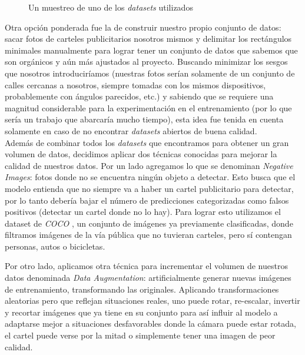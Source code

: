 \documentclass[a4paper]{article}
\begin{document}
\begin{figure}[H]
\caption{Un muestreo de uno de los \textit{datasets} utilizados}
\end{figure}

Otra opción ponderada fue la de construir nuestro propio conjunto de datos: sacar fotos de carteles publicitarios nosotros mismos y delimitar los rectángulos minimales manualmente para lograr tener un conjunto de datos que sabemos que son orgánicos y aún más ajustados al proyecto. Buscando minimizar los sesgos que nosotros introduciríamos (nuestras fotos serían solamente de un conjunto de calles cercanas a nosotros, siempre tomadas con los mismos dispositivos, probablemente con ángulos parecidos, etc.) y sabiendo que se requiere una magnitud considerable para la experimentación en el entrenamiento (por lo que sería un trabajo que abarcaría mucho tiempo), esta idea fue tenida en cuenta solamente en caso de no encontrar \textit{datasets} abiertos de buena calidad. \\

Además de combinar todos los \textit{datasets} que encontramos para obtener un gran volumen de datos, decidimos aplicar dos técnicas conocidas para mejorar la calidad de nuestros datos. Por un lado agregamos lo que se denominan \textit{Negative Images}: fotos donde no se encuentra ningún objeto a detectar. Esto busca que el modelo entienda que no siempre va a haber un cartel publicitario para detectar, por lo tanto debería bajar el número de predicciones categorizadas como falsos positivos (detectar un cartel donde no lo hay). Para lograr esto utilizamos el dataset de \textit{COCO} \cite{coco}, un conjunto de imágenes ya previamente clasificadas, donde filtramos imágenes de la vía pública que no tuvieran carteles, pero sí contengan personas, autos o bicicletas.

Por otro lado, aplicamos otra técnica para incrementar el volumen de nuestros datos denominada \textit{Data Augmentation}: artificialmente generar nuevas imágenes de entrenamiento, transformando las originales. Aplicando transformaciones aleatorias pero que reflejan situaciones reales, uno puede rotar, re-escalar, invertir y recortar imágenes que ya tiene en su conjunto para así influir al modelo a adaptarse mejor a situaciones desfavorables donde la cámara puede estar rotada, el cartel puede verse por la mitad o simplemente tener una imagen de peor calidad.
\end{document}
